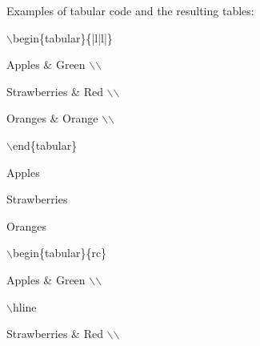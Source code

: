 \documentclass[a4paper,portrait,12pt]{article}
\begin{document}
\begin{flushleft}
Examples of tabular code and the resulting tables:
\end{flushleft}


\begin{flushleft}
\ensuremath{\backslash}begin\{tabular\}\{|l|l|\}
\end{flushleft}


\begin{flushleft}
Apples \& Green \ensuremath{\backslash}\ensuremath{\backslash}
\end{flushleft}


\begin{flushleft}
Strawberries \& Red \ensuremath{\backslash}\ensuremath{\backslash}
\end{flushleft}


\begin{flushleft}
Oranges \& Orange \ensuremath{\backslash}\ensuremath{\backslash}
\end{flushleft}


\begin{flushleft}
\ensuremath{\backslash}end\{tabular\}
\end{flushleft}





\begin{flushleft}
Apples
\end{flushleft}


\begin{flushleft}
Strawberries
\end{flushleft}


\begin{flushleft}
Oranges
\end{flushleft}





\begin{flushleft}
\ensuremath{\backslash}begin\{tabular\}\{rc\}
\end{flushleft}


\begin{flushleft}
Apples \& Green \ensuremath{\backslash}\ensuremath{\backslash}
\end{flushleft}


\begin{flushleft}
\ensuremath{\backslash}hline
\end{flushleft}


\begin{flushleft}
Strawberries \& Red \ensuremath{\backslash}\ensuremath{\backslash}
\end{flushleft}
\end{document}
